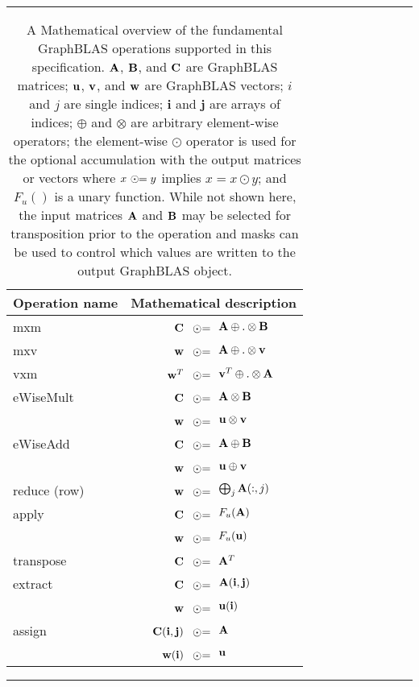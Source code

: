 \begin{table}[h]
\hrule
\begin{center}
\caption{A Mathematical overview of the fundamental GraphBLAS operations supported
in this specification. ${\bf A}$, ${\bf B}$, and ${\bf C}$ are GraphBLAS matrices; 
${\bf u}$, ${\bf v}$, and ${\bf w}$ are GraphBLAS vectors; $i$ and $j$ are single indices;
$\mathbf{i}$ and $\mathbf{j}$ are arrays of indices;
$\oplus$ and $\otimes$ are arbitrary element-wise operators; the element-wise $\odot$
operator is used for the optional accumulation with the output matrices or vectors where 
$x~\odot\hspace{-0.11cm}= y$ implies $x = x \odot y$; and $F_u()$ is a unary function.
While not shown here, the input 
matrices ${\bf A}$ and ${\bf B}$ may be selected for transposition prior to 
the operation and masks can be used to control which values are written to the output GraphBLAS object.}
\label{Tab:GraphBLASOps}
\newcommand{\odotequals}{~\odot\hspace{-0.09cm}=\hspace{-0.2cm}}
\begin{tabular}{l|rl}
{\sf Operation name} & \multicolumn{2}{c}{Mathematical description}  \\
\hline
{\sf mxm}          & ${\bf C}$    $\odotequals$ & ${\bf A} \oplus.\otimes {\bf B}$ \\
{\sf mxv}          & ${\bf w}$    $\odotequals$ & ${\bf A} \oplus.\otimes {\bf v}$ \\
{\sf vxm}          & ${\bf w}^T$  $\odotequals$ & ${\bf v}^T \oplus.\otimes {\bf A}$  \\
{\sf eWiseMult}    & ${\bf C}$    $\odotequals$ & ${\bf A} \otimes {\bf B}$ \\
                   & ${\bf w}$    $\odotequals$ & ${\bf u} \otimes {\bf v}$ \\
{\sf eWiseAdd}     & ${\bf C}$    $\odotequals$ & ${\bf A} \oplus {\bf B}$ \\
                   & ${\bf w}$    $\odotequals$ & ${\bf u} \oplus {\bf v}$ \\
{\sf reduce} (row) & ${\bf w}$    $\odotequals$ & $\bigoplus_j{\bf A}(:,j)$  \\
{\sf apply}        & ${\bf C}$    $\odotequals$ & $F_u({\bf A})$ \\
                   & ${\bf w}$    $\odotequals$ & $F_u({\bf u})$ \\
{\sf transpose}    & ${\bf C}$    $\odotequals$ & ${\bf A}^T$ \\
{\sf extract}      & ${\bf C}$    $\odotequals$ & ${\bf A}({\bf i},{\bf j})$ \\
                   & ${\bf w}$    $\odotequals$ & ${\bf u}({\bf i})$ \\
{\sf assign}       & ${\bf C}({\bf i},{\bf j})$  $\odotequals$ &  ${\bf A}$ \\
                   & ${\bf w}({\bf i})$  $\odotequals$ & ${\bf u}$ 
\end{tabular}

\end{center}
\hrule
\end{table}

